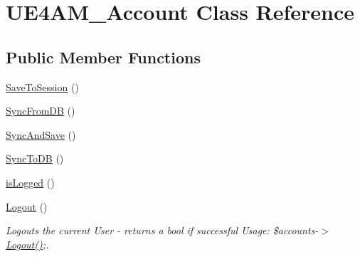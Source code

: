 \hypertarget{class_u_e4_a_m___account}{\section{U\-E4\-A\-M\-\_\-\-Account Class Reference}
\label{class_u_e4_a_m___account}
}
\subsection*{Public Member Functions}
\begin{DoxyCompactItemize}
\item 
\hyperlink{class_u_e4_a_m___account_aea929341ff711e3edb4b70510151c18f}{Save\-To\-Session} ()
\item 
\hyperlink{class_u_e4_a_m___account_a47faa36bae514c842b1dc9fad423c903}{Sync\-From\-D\-B} ()
\item 
\hyperlink{class_u_e4_a_m___account_a33d68748fab386337b1a59e5f6cdc2e2}{Sync\-And\-Save} ()
\item 
\hyperlink{class_u_e4_a_m___account_ab3325f3946176a99f7f276ca5e92f320}{Sync\-To\-D\-B} ()
\item 
\hyperlink{class_u_e4_a_m___account_a2e5051c30251e26c6da72ea9cfbe864f}{is\-Logged} ()
\item 
\hyperlink{class_u_e4_a_m___account_aa14f760d541a59acb41ac8eefddafb9b}{Logout} ()
\begin{DoxyCompactList}\small\item\em Logouts the current User -\/ returns a bool if successful Usage\-: \$accounts-\/$>$\hyperlink{class_u_e4_a_m___account_aa14f760d541a59acb41ac8eefddafb9b}{Logout()};. \end{DoxyCompactList}\end{DoxyCompactItemize}
